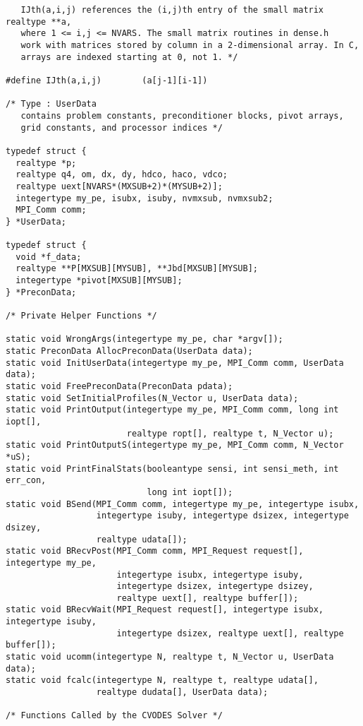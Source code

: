 \begin{verbatim}
   IJth(a,i,j) references the (i,j)th entry of the small matrix realtype **a,
   where 1 <= i,j <= NVARS. The small matrix routines in dense.h
   work with matrices stored by column in a 2-dimensional array. In C,
   arrays are indexed starting at 0, not 1. */

#define IJth(a,i,j)        (a[j-1][i-1])

/* Type : UserData 
   contains problem constants, preconditioner blocks, pivot arrays, 
   grid constants, and processor indices */

typedef struct {
  realtype *p;
  realtype q4, om, dx, dy, hdco, haco, vdco;
  realtype uext[NVARS*(MXSUB+2)*(MYSUB+2)];
  integertype my_pe, isubx, isuby, nvmxsub, nvmxsub2;
  MPI_Comm comm;
} *UserData;

typedef struct {
  void *f_data;
  realtype **P[MXSUB][MYSUB], **Jbd[MXSUB][MYSUB];
  integertype *pivot[MXSUB][MYSUB];
} *PreconData;

/* Private Helper Functions */

static void WrongArgs(integertype my_pe, char *argv[]);
static PreconData AllocPreconData(UserData data);
static void InitUserData(integertype my_pe, MPI_Comm comm, UserData data);
static void FreePreconData(PreconData pdata);
static void SetInitialProfiles(N_Vector u, UserData data);
static void PrintOutput(integertype my_pe, MPI_Comm comm, long int iopt[],
                        realtype ropt[], realtype t, N_Vector u);
static void PrintOutputS(integertype my_pe, MPI_Comm comm, N_Vector *uS);
static void PrintFinalStats(booleantype sensi, int sensi_meth, int err_con, 
                            long int iopt[]);
static void BSend(MPI_Comm comm, integertype my_pe, integertype isubx, 
                  integertype isuby, integertype dsizex, integertype dsizey, 
                  realtype udata[]);
static void BRecvPost(MPI_Comm comm, MPI_Request request[], integertype my_pe,
                      integertype isubx, integertype isuby,
                      integertype dsizex, integertype dsizey,
                      realtype uext[], realtype buffer[]);
static void BRecvWait(MPI_Request request[], integertype isubx, integertype isuby,
                      integertype dsizex, realtype uext[], realtype buffer[]);
static void ucomm(integertype N, realtype t, N_Vector u, UserData data);
static void fcalc(integertype N, realtype t, realtype udata[], 
                  realtype dudata[], UserData data);

/* Functions Called by the CVODES Solver */


\end{verbatim}
